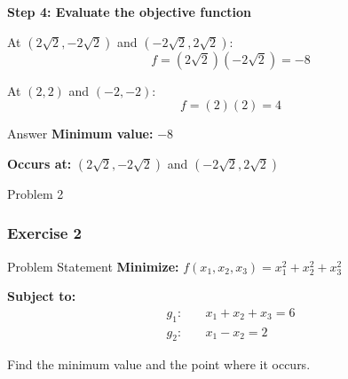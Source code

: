 \documentclass[aspectratio=1610]{beamer}
\begin{document}
\begin{frame}[allowframebreaks]
\framebreak

\textbf{Step 4: Evaluate the objective function}

At $(2\sqrt{2}, -2\sqrt{2})$ and $(-2\sqrt{2}, 2\sqrt{2})$:
$$f = (2\sqrt{2})(-2\sqrt{2}) = -8$$

At $(2, 2)$ and $(-2, -2)$:
$$f = (2)(2) = 4$$

\vspace{0.5cm}
\begin{block}{Answer}
\textbf{Minimum value:} $-8$

\textbf{Occurs at:} $(2\sqrt{2}, -2\sqrt{2})$ and $(-2\sqrt{2}, 2\sqrt{2})$
\end{block}

\end{frame}

Problem 2
\begin{frame}
\frametitle{Exercise 2}
\begin{block}{Problem Statement}
\textbf{Minimize:} $f(x_1, x_2, x_3) = x_1^2 + x_2^2 + x_3^2$

\textbf{Subject to:} 
\begin{align}
g_1: \quad & x_1 + x_2 + x_3 = 6\\
g_2: \quad & x_1 - x_2 = 2
\end{align}
\end{block}

\vspace{1cm}
Find the minimum value and the point where it occurs.
\end{frame}
\end{document}
